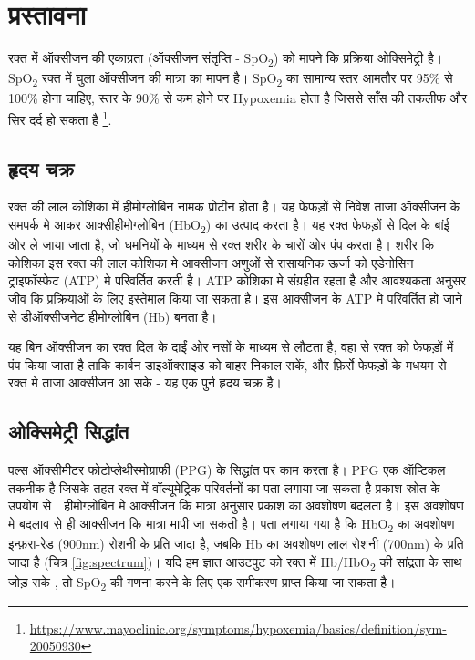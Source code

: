 	
\section{प्रस्तावना}


	रक्त में ऑक्सीजन की एकाग्रता (ऑक्सीजन संतृप्ति - SpO\textsubscript{2}) को मापने कि प्रक्रिया ओक्सिमेट्री है। SpO\textsubscript{2} रक्त में घुला ऑक्सीजन की मात्रा का मापन है। SpO\textsubscript{2} का सामान्य स्तर आमतौर पर 95\% से 100\% होना चाहिए, स्तर के 90\% से कम होने पर Hypoxemia होता है जिससे साँस की तकलीफ और सिर दर्द हो सकता है
	\footnote{\url{https://www.mayoclinic.org/symptoms/hypoxemia/basics/definition/sym-20050930}}.

\subsection{हृदय चक्र}

	रक्त की लाल कोशिका में हीमोग्लोबिन नामक प्रोटीन होता है। यह फेफड़ों से निवेश ताजा ऑक्सीजन के समपर्क मे आकर आक्सीहीमोग्लोबिन (HbO\textsubscript{2}) का उत्पाद करता है। यह रक्त फेफड़ों से दिल के बांई ओर ले जाया जाता है, जो धमनियों के माध्यम से रक्त शरीर के चारों ओर पंप करता है।
	शरीर कि कोशिका इस रक्त की लाल कोशिका मे आक्सीजन अणुओं से रासायनिक ऊर्जा को एडेनोसिन ट्राइफॉस्फेट (ATP) मे परिवर्तित
	करती है। ATP कोशिका मे संग्रहीत रहता है और आवश्यकता अनुसर जीव कि प्रक्रियाओं के लिए इस्तेमाल किया जा सकता है। इस आक्सीजन के ATP मे परिवर्तित हो जाने से डीऑक्सीजनेट हीमोग्लोबिन (Hb) बनता है।

	यह बिन ऑक्सीजन का रक्त दिल के दाईं ओर नसों के माध्यम से लौटता है, वहा से रक्त को फेफड़ों में पंप किया जाता है ताकि कार्बन डाइऑक्साइड को बाहर निकाल सकें, और फ़िर्से फेफड़ों के मधयम से रक्त मे ताजा आक्सीजन आ सके - यह एक पुर्न हृदय चक्र है।
\subsection{ओक्सिमेट्री सिद्धांत}

	पल्स ऑक्सीमीटर फोटोप्लेथीस्मोग्राफी (PPG) के सिद्धांत पर काम करता है। PPG एक ऑप्टिकल तकनीक है जिसके तहत रक्त में वॉल्यूमेट्रिक परिवर्तनों का पता लगाया जा सकता है प्रकाश स्रोत के उपयोग से। हीमोग्लोबिन मे आक्सीजन कि मात्रा अनुसार प्रकाश का अवशोषण बदलता है। इस अवशोषण मे बदलाव से ही आक्सीजन कि मात्रा मापी जा सकती है। पता लगाया गया है कि HbO\textsubscript{2} का अवशोषण इन्फ़रा-रेड (900nm) रोशनी के प्रति जादा है, जबकि Hb का अवशोषण लाल रोशनी (700nm) के प्रति जादा है (चित्र \ref{fig:spectrum})।
	यदि हम ज्ञात आउटपुट को रक्त में Hb/HbO\textsubscript{2} की सांद्रता के साथ जोड़ सके , तो SpO\textsubscript{2} की गणना करने के लिए एक समीकरण प्राप्त किया जा सकता है।

